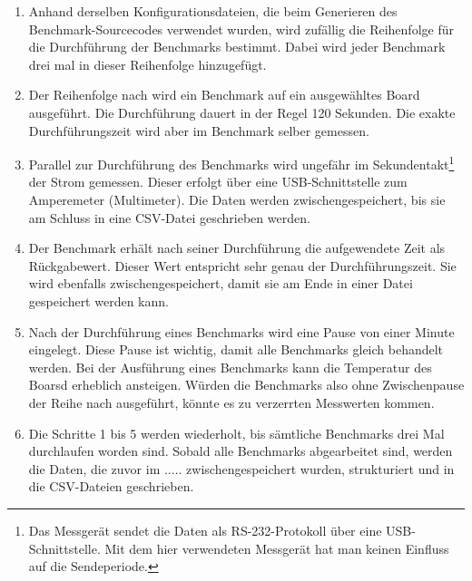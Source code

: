 \begin{enumerate}
\item Anhand derselben Konfigurationsdateien, die beim Generieren des Benchmark-Sourcecodes verwendet wurden, wird zufällig die Reihenfolge für die Durchführung der Benchmarks bestimmt. Dabei wird jeder Benchmark drei mal in dieser Reihenfolge hinzugefügt.
\item Der Reihenfolge nach wird ein Benchmark auf ein ausgewähltes Board ausgeführt. Die Durchführung dauert in der Regel 120 Sekunden. Die exakte Durchführungszeit wird aber im Benchmark selber gemessen.
\item Parallel zur Durchführung des Benchmarks wird ungefähr im Sekundentakt\footnote{Das Messgerät sendet die Daten als RS-232-Protokoll über eine USB-Schnittstelle. Mit dem hier verwendeten Messgerät hat man keinen Einfluss auf die Sendeperiode.} der Strom gemessen. Dieser erfolgt über eine USB-Schnittstelle zum Amperemeter (Multimeter). Die Daten werden zwischengespeichert, bis sie am Schluss in eine CSV-Datei geschrieben werden.
\item Der Benchmark erhält nach seiner Durchführung die aufgewendete Zeit als Rückgabewert. Dieser Wert entspricht sehr genau der Durchführungszeit. Sie wird ebenfalls zwischengespeichert, damit sie am Ende in einer Datei gespeichert werden kann.
\item Nach der Durchführung eines Benchmarks wird eine Pause von einer Minute eingelegt. Diese Pause ist wichtig, damit alle Benchmarks gleich behandelt werden. Bei der Ausführung eines Benchmarks kann die Temperatur des Boarsd erheblich ansteigen. Würden die Benchmarks also ohne Zwischenpause der Reihe nach ausgeführt, könnte es zu verzerrten Messwerten kommen.
\item Die Schritte 1 bis 5 werden wiederholt, bis sämtliche Benchmarks drei Mal durchlaufen worden sind. Sobald alle Benchmarks abgearbeitet sind, werden die Daten, die zuvor im ..... zwischengespeichert wurden, strukturiert und in die CSV-Dateien geschrieben.
\end{enumerate}